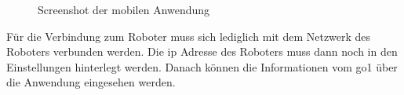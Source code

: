 \begin{figure}[h]
    \caption{Screenshot der mobilen Anwendung}\label{fig:android}
\end{figure}

\noindent Für die Verbindung zum Roboter muss sich lediglich mit dem Netzwerk des Roboters verbunden werden.
Die \gls{ip} Adresse des Roboters muss dann noch in den Einstellungen hinterlegt werden.
Danach können die Informationen vom \gls{go1} über die Anwendung eingesehen werden.